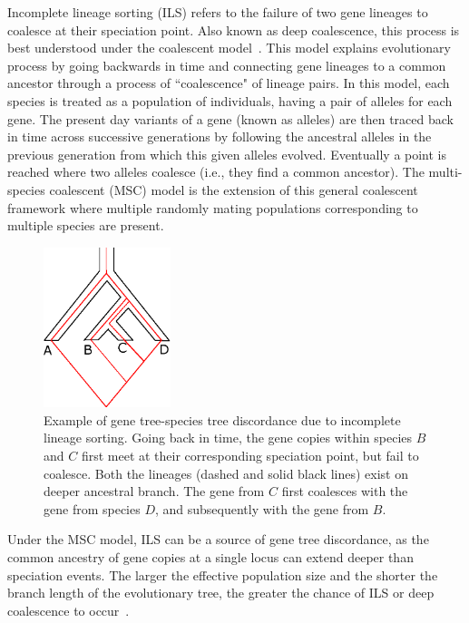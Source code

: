Incomplete lineage sorting (ILS) refers to the failure of two gene lineages to coalesce at their speciation point. Also known as deep coalescence, this process is best understood under the coalescent model~\cite{degnan2006discordance, degnan2005gene}. This model explains evolutionary process by going backwards in time and connecting gene lineages to a common ancestor through a process of ``coalescence" of lineage pairs. In this model, each species is treated as a population of individuals, having a pair of alleles for each gene. The present day variants of a gene (known as alleles) are then traced back in time across successive generations by following the ancestral alleles in the previous generation from which this given alleles evolved. Eventually a point is reached where two alleles coalesce (i.e., they find a common ancestor). The multi-species coalescent (MSC) model is the extension of this general coalescent framework where multiple randomly mating populations corresponding to multiple species are present.
\begin{figure}[!tb]
	\centering
	\includegraphics[width=0.33\textwidth]{Figure/ils.eps}
	\caption{Example of gene tree-species tree discordance due to incomplete lineage sorting. Going back in time, the gene copies within species $B$ and $C$ first meet at their corresponding speciation point, but fail to coalesce. Both the lineages (dashed and solid black lines) exist on deeper ancestral branch. The gene from $C$ first coalesces with the gene from species $D$, and subsequently with the gene from $B$.
	}
	\label{fig:ils}
\end{figure}
Under the MSC model, ILS can be a source of gene tree discordance, as the common ancestry of gene copies at a single locus can extend deeper than speciation events. The larger the effective population size and the shorter the branch length of the evolutionary tree, the greater the chance of ILS or deep coalescence to occur~\cite{maddison1997gene}.

